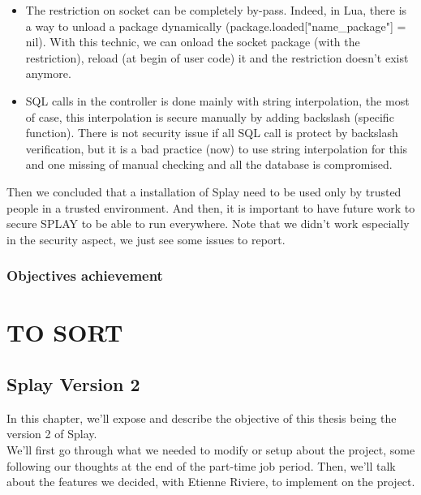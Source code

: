 \documentclass{eplmastersthesis}
\begin{document}
        \begin{itemize}
          \item The restriction on socket can be completely by-pass. Indeed, in Lua, there is a way to unload
          a package dynamically (package.loaded["name\_package"] = nil). With this technic, we can onload the socket
          package (with the restriction), reload (at begin of user code) it and the restriction doesn't exist anymore.
          \item SQL calls in the controller is done mainly with string interpolation, the most of case,
          this interpolation is secure manually by adding backslash (specific function). There is not
          security issue if all SQL call is protect by backslash verification, but it is a bad practice (now)
          to use string interpolation for this and one missing of manual checking and all the database is compromised.
        \end{itemize}

        Then we concluded that a installation of Splay need to be used only by trusted people in a trusted environment.
        And then, it is important to have future work to secure SPLAY to be able to run everywhere. Note that we didn't
        work especially in the security aspect, we just see some issues to report.

    \section{Objectives achievement}

\part{TO SORT}


  \chapter{Splay Version 2}

    In this chapter, we'll expose and describe the objective of this thesis
    being the version 2 of Splay.\\

    We'll first go through what we needed to modify or setup about the project,
    some following our thoughts at the end of the part-time job period.
    Then, we'll talk about the features we decided, with Etienne Riviere, to
    implement on the project.
\end{document}
